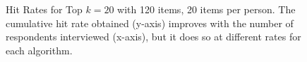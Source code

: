 \documentclass[a4paper,12pt]{article}
\newcommand{\eric}[1]{\textcolor{red}{\textbf{(eric)} #1}}
\newcommand{\fixedexpress}{\textbf{express}}
\newcommand{\egreedy}{$\epsilon$-\textbf{greedy}}
\newcommand{\ts}{\textbf{TS} }
\newcommand{\edts}{$\epsilon$-$\delta$-\textbf{diffuse TS} }
\newcommand{\edtsthres}{$\epsilon$-$\delta$-\textbf{TS-thres} }
\begin{document}
\begin{figure}%
    \caption{Hit Rates for Top $k=20$ with 120 items, 20 items per person. The cumulative hit rate obtained (y-axis) improves with the number of respondents interviewed (x-axis), but it does so at different rates for each algorithm. }%
    \label{fig:K120_L20_k3hit_k10hit}%
 	\begin{center}
    \qquad
	\end{center}
\end{figure}

\end{document}

